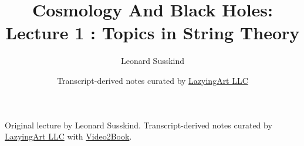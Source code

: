 \documentclass[11pt,oneside]{book}
\begin{document}
\frontmatter
\title{Cosmology And Black Holes: Lecture 1 : Topics in String Theory}
\author{Leonard Susskind}
\date{Transcript-derived notes curated by \href{https://lazying.art}{LazyingArt LLC}}
\maketitle
\begin{center}
\small Original lecture by Leonard Susskind. Transcript-derived notes curated by \href{https://lazying.art}{LazyingArt LLC} with \href{https://github.com/lachlanchen/Video2Book}{Video2Book}.
\end{center}
\clearpage
\mainmatter

\end{document}
